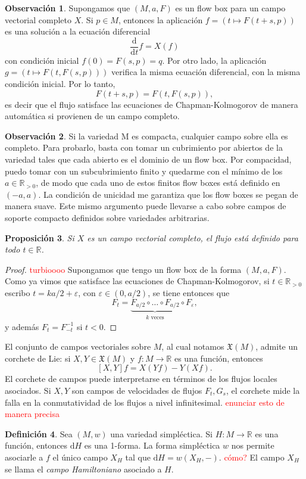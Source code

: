 \documentclass[11pt, a4paper]{article}
\newcommand{\RR}{\mathbb{R}}
\newcommand{\XX}{\mathfrak{X}}
\theoremstyle{plain}
\newtheorem{prop}{Proposición}[section]
\theoremstyle{definition}
\newtheorem{defn}[prop]{Definición}
\newtheorem{obs}[prop]{Observación}
\begin{document}
\begin{obs} Supongamos que $(M,a,F)$ es un flow box para un campo vectorial completo $X$. Si $p\in M$, entonces la aplicación $f=(t\mapsto F(t+s,p))$ es una solución a la ecuación diferencial
\[\frac{\mathrm{d}}{\mathrm{d}t}f = X(f)\]
con condición inicial $f(0)=F(s,p)=q$. Por otro lado, la aplicación $g=(t\mapsto F(t,F(s,p)))$ verifica la misma ecuación diferencial, con la misma condición inicial. Por lo tanto,
\[F(t+s, p) = F(t,F(s,p)),\]
es decir que el flujo satisface las ecuaciones de Chapman-Kolmogorov de manera automática si provienen de un campo completo.
\end{obs}
\begin{obs} Si la variedad M es compacta, cualquier campo sobre ella es completo. Para probarlo, basta con tomar un cubrimiento por abiertos de la variedad tales que cada abierto es el dominio de un flow box. Por compacidad, puedo tomar con un subcubrimiento finito y quedarme con el mínimo de los $a\in \RR_{>0}$, de modo que cada uno de estos finitos flow boxes está definido en $(-a,a)$. La condición de unicidad me garantiza que los flow boxes se pegan de manera suave. Este mismo argumento puede llevarse a cabo sobre campos de soporte compacto definidos sobre variedades arbitrarias.
\end{obs}
\begin{prop} Si $X$ es un campo vectorial completo, el flujo está definido para todo $t\in \RR$.
\end{prop}
\begin{proof} \textcolor{red}{turbioooo} Supongamos que tengo un flow box de la forma $(M,a,F)$. Como ya vimos que satisface las ecuaciones de Chapman-Kolmogorov, si $t\in\RR_{>0}$ escribo $t=ka/2 + \varepsilon$, con $\varepsilon \in (0,a/2)$, se tiene entonces que
\[F_t = \underbrace{F_{a/2}\circ\dots\circ F_{a/2}}_{\substack{\text{$k$ veces}}}\circ F_\varepsilon,\]
y además $F_t = F_{-t}^{-1}$ si $t<0$.
\end{proof}
El conjunto de campos vectoriales sobre $M$, al cual notamos $\XX(M)$, admite un corchete de Lie: si $X,Y\in \XX(M)$ y $f:M\to \RR$ es una función, entonces
\[[X,Y]f = X(Yf) - Y(Xf).\]
El corchete de campos puede interpretarse en términos de los flujos locales asociados. Si $X, Y$ son campos de velocidades de flujos $F_t, G_s$, el corchete mide la falla en la conmutatividad de los flujos a nivel infinitesimal. \textcolor{red}{enunciar esto de manera precisa}

\begin{defn} Sea $(M,w)$ una variedad simpléctica. Si $H:M\to \RR$ es una función, entonces $\mathrm{d}H$ es una 1-forma. La forma simpléctica $w$ nos permite asociarle a $f$ el único campo $X_H$ tal que $\mathrm{d}H = w(X_H, -)$. \textcolor{red}{cómo?} El campo $X_H$ se llama el \emph{campo Hamiltoniano} asociado a $H$.
\end{defn}
\end{document}
